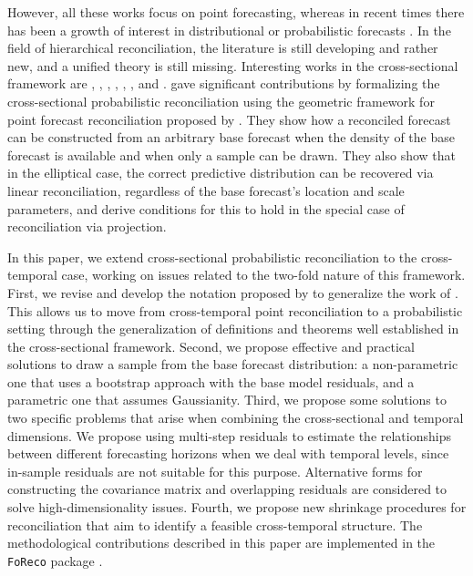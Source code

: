 \documentclass[a4paper,11pt]{article}
\theoremstyle{definition}
\begin{document}
However, all these works focus on point forecasting, whereas in recent times there has been a growth of interest in distributional or probabilistic forecasts  \citep{gneiting2014}. In the field of hierarchical reconciliation, the literature is still developing and rather new, and a unified theory is still missing. Interesting works in the cross-sectional framework are \cite{bentaieb2017}, \cite{panamtash2018}, \cite{jeon2019}, \cite{bentaieb2021}, \cite{corani2021}, \cite{corani2022}, and \cite{zambon2022}. \cite{panagiotelis2023} gave significant contributions by formalizing the cross-sectional probabilistic reconciliation using the geometric framework for point forecast reconciliation proposed by \cite{panagiotelis2021}. They show how a reconciled forecast can be constructed from an arbitrary base forecast %
when the density of the base forecast is available and when only a sample can be drawn. They also show that in the elliptical case, the correct predictive distribution can be recovered via linear reconciliation, regardless of the base forecast's location and scale parameters, and derive conditions for this to hold in the special case of reconciliation via projection.

In this paper, we extend cross-sectional probabilistic reconciliation to the cross-temporal case, working on issues related to the two-fold nature of this framework. First, we revise and develop the notation proposed by \cite{difonzo2023} to generalize the work of \cite{panagiotelis2023}. This allows us to move from cross-temporal point reconciliation to a probabilistic setting through the generalization of definitions and theorems well established in the cross-sectional framework. Second, we propose effective and practical solutions to draw a sample from the base forecast distribution: a non-parametric one that uses a bootstrap approach with the base model residuals, and a parametric one that assumes Gaussianity. Third, we propose some solutions to two specific problems that arise when combining the cross-sectional and temporal dimensions. We propose using multi-step residuals to estimate the relationships between different forecasting horizons when we deal with temporal levels, since in-sample residuals are not suitable for this purpose. Alternative forms for constructing the covariance matrix and overlapping residuals are considered to solve high-dimensionality issues. Fourth, we propose new shrinkage procedures for reconciliation that aim to identify a feasible cross-temporal structure. The methodological contributions described in this paper are implemented in the \texttt{FoReco} package \citep{girolimetto2022}.
\end{document}

